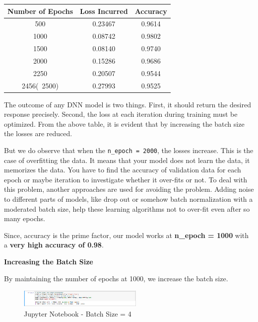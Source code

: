 \documentclass[conference,compsoc]{IEEEtran}
\begin{document}
\begin{center}
    \begin{tabular}{ |c|c|c| } 
        \hline
        Number of Epochs & Loss Incurred & Accuracy \\ [0.5ex]
        \hline\hline
        500 & 0.23467 & 0.9614 \\
        1000 & 0.08742 & 0.9802 \\
        1500 & 0.08140 & 0.9740 \\
        2000 & 0.15286 & 0.9686 \\
        2250 & 0.20507 & 0.9544 \\
        2456(~2500) & 0.27993 & 0.9525 \\
        \hline
    \end{tabular}
\end{center}

The outcome of any DNN model is two things. First, it should return the desired response precisely. Second, the loss at each iteration during training must be optimized. From the above table, it is evident that by increasing the batch size the losses are reduced.

But we do observe that when the \texttt{n\_epoch = 2000}, the losses increase. This is the case of overfitting the data. It means that your model does not learn the data, it memorizes the data. You have to find the accuracy of validation data for each epoch or maybe iteration to investigate whether it over-fits or not. To deal with this problem, another approaches are used for avoiding the problem. Adding noise to different parts of models, like drop out or somehow batch normalization with a moderated batch size, help these learning algorithms not to over-fit even after so many epochs.

Since, accuracy is the prime factor, our model works at \textbf{n\_epoch = 1000} with a \textbf{very high accuracy of 0.98}.

\textbf{Increasing the Batch Size}

By maintaining the number of epochs at 1000, we increase the batch size.

\begin{figure}[H]
    \centering
    \includegraphics[width=6cm]{screenshots/jupyter-notebook/batch-size-4.png}
    \caption{Jupyter Notebook - Batch Size = 4}
\end{figure}
\end{document}
